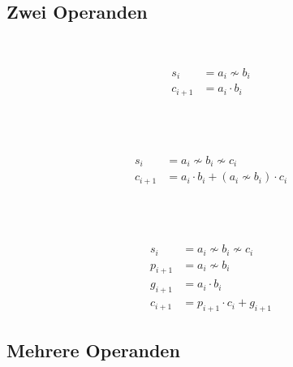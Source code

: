 \subsection{Zwei Operanden}

\begin{boxleft}
\\
\end{boxleft}\begin{boxrightshaded}
\begin{align*}
s_i&=a_i\nsim b_i\\
c_{i+1}&=a_i \cdot b_i
\end{align*}
\end{boxrightshaded}

\begin{boxleft}
\\
\\
\end{boxleft}\begin{boxrightshaded}
\begin{align*}
s_i&=a_i\nsim b_i \nsim c_i\\
c_{i+1}&=a_i \cdot b_i+\left(a_i\nsim b_i\right)\cdot c_i
\end{align*}
\end{boxrightshaded}

\begin{boxleft}
\\
\\
\end{boxleft}\begin{boxrightshaded}
\begin{align*}
s_i&=a_i\nsim b_i \nsim c_i\\
p_{i+1}&=a_i\nsim b_i\\
g_{i+1}&=a_i\cdot b_i\\
c_{i+1}&=p_{i+1}\cdot c_i +g_{i+1}
\end{align*}
\end{boxrightshaded}

\subsection{Mehrere Operanden}

